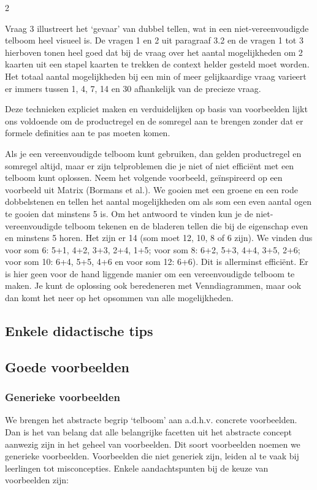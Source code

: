 \begin{multicols}{2}
\begin{vraagenantwoord}
\end{vraagenantwoord}
Vraag 3 illustreert het ‘gevaar’ van dubbel tellen, wat in een niet-vereenvoudigde telboom heel visueel is. De vragen 1 en 2 uit paragraaf 3.2 en de vragen 1 tot 3 hierboven tonen heel goed dat bij de vraag over het aantal mogelijkheden om 2 kaarten uit een stapel kaarten te trekken de context helder gesteld moet worden. Het totaal aantal mogelijkheden bij een min of meer gelijkaardige vraag varieert er immers tussen 1, 4, 7, 14 en 30 afhankelijk van de precieze vraag.

Deze technieken expliciet maken en verduidelijken op basis van voorbeelden lijkt ons voldoende om de productregel en de somregel aan te brengen zonder dat er formele definities aan te pas moeten komen. 

Als je een vereenvoudigde telboom kunt gebruiken, dan gelden productregel en somregel altijd, maar er zijn telproblemen die je niet of niet efficiënt met een telboom kunt oplossen. Neem het volgende voorbeeld, geïnspireerd op een voorbeeld uit Matrix (Bormans et al.). We gooien met een groene en een rode dobbelstenen en tellen het aantal mogelijkheden om als som een even aantal ogen te gooien dat minstens 5 is. Om het antwoord te vinden kun je de niet-vereenvoudigde telboom tekenen en de bladeren tellen die bij de eigenschap even en minstens 5 horen. Het zijn er 14 (som moet 12, 10, 8 of 6 zijn). We vinden dus voor som 6: 5+1, 4+2, 3+3, 2+4, 1+5; voor som 8: 6+2, 5+3, 4+4, 3+5, 2+6; voor som 10: 6+4, 5+5, 4+6 en voor som 12: 6+6). Dit is allerminst efficiënt. Er is hier geen voor de hand liggende manier om een vereenvoudigde telboom te maken. Je kunt de oplossing ook beredeneren met Venndiagrammen, maar ook dan komt het neer op het opsommen van alle mogelijkheden.

\subsection{Enkele didactische tips}

\subsection*{Goede voorbeelden}
\subsubsection{Generieke voorbeelden}
We brengen het abstracte begrip ‘telboom’ aan a.d.h.v. concrete voorbeelden. Dan is het van belang dat alle belangrijke facetten uit het abstracte concept aanwezig zijn in het geheel van voorbeelden. Dit soort voorbeelden noemen we generieke voorbeelden. Voorbeelden die niet generiek zijn, leiden al te vaak bij leerlingen tot misconcepties. Enkele aandachtspunten bij de keuze van voorbeelden zijn:




\end{multicols}
